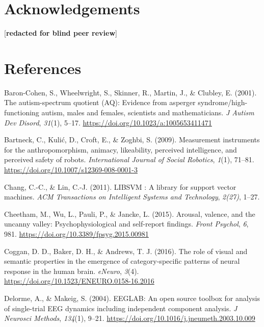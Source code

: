\documentclass[
]{article}
\newlength{\cslhangindent}
\newenvironment{CSLReferences}[2] %
 {\begin{list}{}{%
  \setlength{\itemindent}{0pt}
  \setlength{\leftmargin}{0pt}
  \setlength{\parsep}{0pt}
  \ifodd #1
   \setlength{\leftmargin}{\cslhangindent}
   \setlength{\itemindent}{-1\cslhangindent}
  \fi
  \setlength{\itemsep}{#2\baselineskip}}}
 {\end{list}}
\begin{document}
\section{Acknowledgements}\label{acknowledgements}

{[}\textbf{redacted for blind peer review}{]}

\section*{References}\label{references}

\label{refs}
\begin{CSLReferences}{1}{0}
Baron-Cohen, S., Wheelwright, S., Skinner, R., Martin, J., \& Clubley, E. (2001). The autism-spectrum quotient (AQ): Evidence from asperger syndrome/high-functioning autism, males and females, scientists and mathematicians. \emph{J Autism Dev Disord}, \emph{31}(1), 5--17. \url{https://doi.org/10.1023/a:1005653411471}

Bartneck, C., Kulić, D., Croft, E., \& Zoghbi, S. (2009). Measurement instruments for the anthropomorphism, animacy, likeability, perceived intelligence, and perceived safety of robots. \emph{International Journal of Social Robotics}, \emph{1}(1), 71--81. \url{https://doi.org/10.1007/s12369-008-0001-3}

Chang, C.-C., \& Lin, C.-J. (2011). {LIBSVM} : A library for support vector machines. \emph{ACM Transactions on Intelligent Systems and Technology}, \emph{2(27)}, 1--27.

Cheetham, M., Wu, L., Pauli, P., \& Jancke, L. (2015). Arousal, valence, and the uncanny valley: Psychophysiological and self-report findings. \emph{Front Psychol}, \emph{6}, 981. \url{https://doi.org/10.3389/fpsyg.2015.00981}

Coggan, D. D., Baker, D. H., \& Andrews, T. J. (2016). The role of visual and semantic properties in the emergence of category-specific patterns of neural response in the human brain. \emph{eNeuro}, \emph{3}(4). \url{https://doi.org/10.1523/ENEURO.0158-16.2016}

Delorme, A., \& Makeig, S. (2004). {EEGLAB}: An open source toolbox for analysis of single-trial {EEG} dynamics including independent component analysis. \emph{J Neurosci Methods}, \emph{134}(1), 9--21. \url{https://doi.org/10.1016/j.jneumeth.2003.10.009}


\end{CSLReferences}
\end{document}

